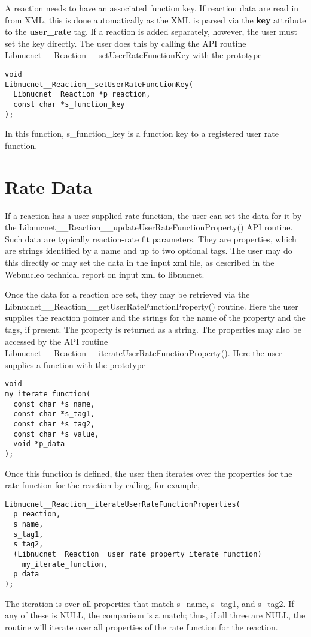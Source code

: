 \documentclass{article}    %
\begin{document}
A reaction needs to have an associated function key.  If reaction data
are read in from XML, this is done automatically as the XML is parsed
via the {\bf key} attribute to the {\bf user\_rate} tag.
If a reaction is added separately, however, the user must set the
key directly.  The user does this by calling the
API routine Libnucnet\_\_Reaction\_\_setUserRateFunctionKey with the
prototype
\begin{verbatim}
void
Libnucnet__Reaction__setUserRateFunctionKey(
  Libnucnet__Reaction *p_reaction,
  const char *s_function_key
);
\end{verbatim}
In this function, s\_function\_key is a function key to a registered
user rate function. 

\section{Rate Data}

If a reaction has a user-supplied rate function, the user can set the
data for it by the Libnucnet\_\_Reaction\_\_updateUserRateFunctionProperty()
API routine.  Such data are typically reaction-rate fit parameters.
They are properties, which are strings
identified by a name and up to two optional tags.  The user may do this
directly or may set the data in the input xml file, as described in the
Webnucleo technical report on input xml to libnucnet.

Once the data for a reaction are set, they may be retrieved via the
Libnucnet\_\_Reaction\_\_getUserRateFunctionProperty() routine.  Here
the user supplies the reaction pointer and the strings for the name
of the property and the tags, if present.  The property is returned as a
string.  The properties may also be accessed by the API routine
Libnucnet\_\_Reaction\_\_iterateUserRateFunctionProperty().  Here the user
supplies a function with the prototype
\begin{verbatim}
void
my_iterate_function(
  const char *s_name,
  const char *s_tag1,
  const char *s_tag2,
  const char *s_value,
  void *p_data
);
\end{verbatim} 
Once this function is defined, the user then iterates over the properties
for the rate function for the reaction by calling, for example,
\begin{verbatim}
Libnucnet__Reaction__iterateUserRateFunctionProperties(
  p_reaction,
  s_name,
  s_tag1,
  s_tag2,
  (Libnucnet__Reaction__user_rate_property_iterate_function)
    my_iterate_function,
  p_data
);
\end{verbatim}
The iteration is over all properties that match s\_name, s\_tag1, and s\_tag2.
If any of these is NULL, the comparison is a match; thus, if all three are
NULL, the routine will iterate over all properties of the rate function
for the reaction.
\end{document}
